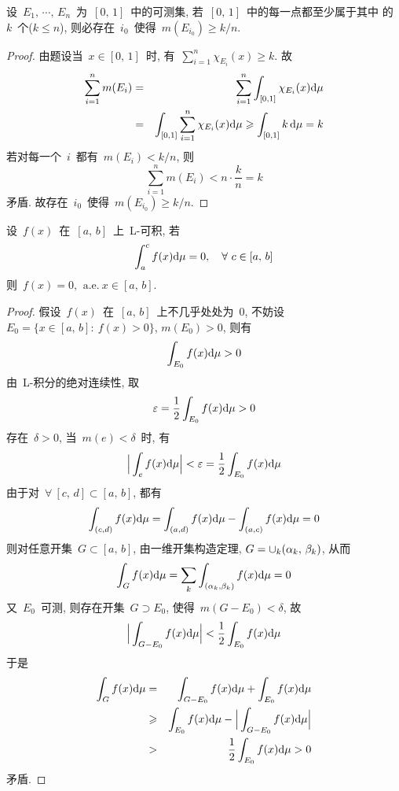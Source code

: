 \begin{example}
设~$E_1,\, \cdots,\, E_n$~为~$[0,\, 1]$~中的可测集, 若~$[0,\, 1]$~中的每一点都至少属于其中
的~$k$~个($k \leqslant n$), 则必存在~$i_0$~使得~$m(E_{i_0}) \geqslant k/n$.
\end{example}

\begin{proof}
由题设当~$x \in [0,\, 1]$~时, 有~$\sum\limits_{i=1}^n \chi_{E_i}(x) \geqslant k$. 故
\begin{eqnarray*}
\sum_{i=1}^n m(E_i) &=& \sum_{i=1}^n \int_{[0,1]} \chi_{E_i}(x) \mathrm{d} \mu \\
&=& \int_{[0,1]} \sum_{i=1}^n \chi_{E_i}(x) \mathrm{d} \mu \geqslant \int_{[0,1]} k ~\! \mathrm{d} \mu = k
\end{eqnarray*}
若对每一个~$i$~都有~$m(E_i) < k/n$, 则
\[
\sum\limits_{i=1}^n m(E_i) < n \cdot \frac{k}{n} = k
\]
矛盾. 故存在~$i_0$~使得~$m(E_{i_0}) \geqslant k/n$.
\end{proof}

\begin{example}
设~$f(x)$~在~$[a,\, b]$~上~L-可积, 若
\[
\int_a^c f(x) \mathrm{d} \mu = 0, \quad  \forall~c \in [a,\, b]
\]
则~$f(x) = 0,\, \mathrm{~a.e.~} x \in [a,\, b]$.
\end{example}

\begin{proof}
假设~$f(x)$~在~$[a,\, b]$~上不几乎处处为~$0$, 不妨设~$E_0 = \{x \in [a,\, b]:\: f(x) > 0\}$, $m(E_0) > 0$,  则有
\[
\int_{E_0} f(x) \mathrm{d} \mu > 0
\]
由~L-积分的绝对连续性, 取
\[
\varepsilon = \frac{1}{2}\int_{E_0} f(x) \mathrm{d} \mu > 0
\]
存在~$\delta > 0$, 当~$m(e) < \delta$~时, 有
\[
\Big| \int_e f(x) \mathrm{d} \mu \Big| < \varepsilon = \frac{1}{2}\int_{E_0} f(x) \mathrm{d} \mu
\]
由于对~$\forall~[c,\, d] \subset [a,\, b]$, 都有
\[
\int_{(c, d)} f(x) \mathrm{d} \mu = \int_{(a, d)} f(x) \mathrm{d} \mu - \int_{(a,c)} f(x) \mathrm{d} \mu = 0
\]
则对任意开集~$G \subset [a,\, b]$, 由一维开集构造定理, $G = \mathop{\mathop{\cup}}_k (\alpha_k,\, \beta_k)$,  从而
\[
\int_G f(x) \mathrm{d} \mu = \sum_k \int_{(\alpha_k,\beta_k)} f(x) \mathrm{d} \mu = 0
\]
又~$E_0$~可测, 则存在开集~$G \supset E_0$, 使得~$m(G - E_0) < \delta$, 故
\[
\Big|\int_{G-E_0} f(x) \mathrm{d} \mu \Big| < \frac{1}{2}\int_{E_0} f(x) \mathrm{d} \mu
\]
于是
\begin{eqnarray*}
\int_G f(x) \mathrm{d} \mu &=& \int_{G-E_0} f(x) \mathrm{d} \mu + \int_{E_0} f(x) \mathrm{d} \mu \\
&\geqslant& \int_{E_0} f(x) \mathrm{d} \mu - \Big|\int_{G-E_0} f(x) \mathrm{d} \mu \Big| \\
&>& \frac{1}{2}\int_{E_0} f(x) \mathrm{d} \mu > 0
\end{eqnarray*}
矛盾.
\end{proof}

